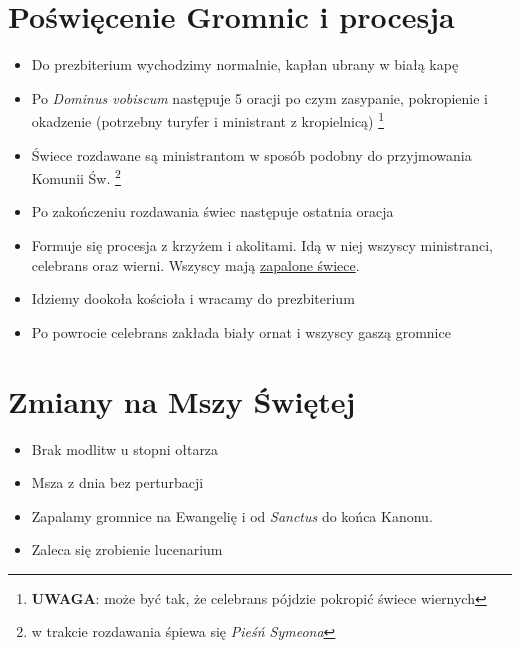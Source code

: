 \documentclass[10pt,a4paper]{instrukcja}
\begin{document}

\section{Poświęcenie Gromnic i procesja}

\begin{itemize}
	\item Do prezbiterium wychodzimy normalnie, kapłan ubrany w białą kapę
	\item Po \textit{Dominus vobiscum} następuje 5 oracji po czym zasypanie,
	      pokropienie i okadzenie (potrzebny turyfer i ministrant z kropielnicą)
	      \footnote{\textbf{UWAGA}: może być tak, że celebrans pójdzie pokropić
		      świece wiernych}
	\item Świece rozdawane są ministrantom w sposób podobny do przyjmowania
	      Komunii Św.
	      \footnote{w trakcie rozdawania śpiewa się \textit{Pieśń Symeona}}
	\item Po zakończeniu rozdawania świec następuje ostatnia oracja
	\item Formuje się procesja z krzyżem i akolitami. Idą w niej wszyscy
	      ministranci, celebrans oraz  wierni. Wszyscy mają \underline{zapalone świece}.
	\item Idziemy dookoła kościoła i wracamy do prezbiterium
	\item Po powrocie celebrans zakłada biały ornat i wszyscy gaszą gromnice
\end{itemize}

\section{Zmiany na Mszy Świętej}

\begin{itemize}
	\item Brak modlitw u stopni ołtarza
	\item Msza z dnia bez perturbacji
	\item Zapalamy gromnice na Ewangelię i od \textit{Sanctus} do końca Kanonu.
	\item Zaleca się zrobienie lucenarium
\end{itemize}
\end{document}
